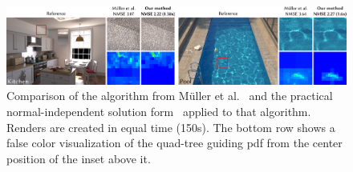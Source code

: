\begin{figure}[h]
    \centering
    \includegraphics[width=\textwidth]{images/pg_scenes.png}
    \caption{Comparison of the algorithm from M\"uller et al.~\cite{mueller2017} and the practical normal-independent solution form~\cite{Karlik2019} applied to that algorithm.
    Renders are created in equal time (150s).
    The bottom row shows a false color visualization of the quad-tree guiding pdf from the center position of the inset above it.
    \cite[Figure~10]{Karlik2019}}
    \label{fig:path_scenes}
\end{figure}